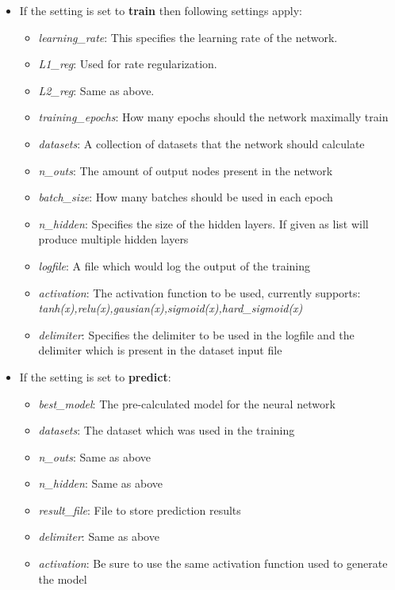 \documentclass[12pt]{article}
\begin{document}
\begin{itemize}
    \item If the setting is set to \textbf{train} then following settings apply:
    \begin{itemize}
        \item \emph{learning\_rate}: This specifies the learning rate of the network.
        \item \emph{L1\_reg}: Used for rate regularization. 
        \item \emph{L2\_reg}: Same as above.
        \item \emph{training\_epochs}: How many epochs should the network maximally train
        \item \emph{datasets}: A collection of datasets that the network should calculate
        \item \emph{n\_outs}: The amount of output nodes present in the network
        \item \emph{batch\_size}: How many batches should be used in each epoch
        \item \emph{n\_hidden}: Specifies the size of the hidden layers. If given as list will produce multiple hidden layers
        \item \emph{logfile}: A file which would log the output of the training
        \item \emph{activation}: The activation function to be used, currently supports: \textit{tanh(x),relu(x),gausian(x),sigmoid(x),hard\_sigmoid(x)}
        \item \emph{delimiter}: Specifies the delimiter to be used in the logfile and the delimiter which is present in the dataset input file
    \end{itemize}
    \item If the setting is set to \textbf{predict}:
        \begin{itemize}
            \item \emph{best\_model}: The pre-calculated model for the neural network
            \item \emph{datasets}: The dataset which was used in the training 
            \item \emph{n\_outs}: Same as above
            \item \emph{n\_hidden}: Same as above
            \item \emph{result\_file}: File to store prediction results
            \item \emph{delimiter}: Same as above
            \item \emph{activation}: Be sure to use the same activation function used to generate the model
        \end{itemize}
\end{itemize}
\end{document}
